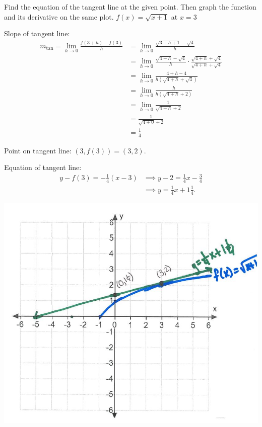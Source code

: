 \documentclass[nooutcomes, handout]{ximera}
\begin{document}
\begin{problem} Find the equation of the tangent line at the given point.  Then graph the function and its derivative on the same plot.
$f(x)=\sqrt{x+1}$ at $x=3$

	\begin{freeResponse}
	Slope of tangent line:
	\begin{align*}	
	m_{\mathrm{tan}} = \lim_{h \to 0} \frac{f(3+h) - f(3)}{h}&=\lim_{h \to 0}\frac{\sqrt{3+h+1} - \sqrt{4}}{h}\\
	&=\lim_{h \to 0}\frac{\sqrt{4+h} - \sqrt{4}}{h} \cdot \frac{\sqrt{4+h} + \sqrt{4}}{\sqrt{4+h} + \sqrt{4}}\\
	&=\lim_{h \to 0}\frac{4+h-4}{h(\sqrt{4+h} + \sqrt{4})}\\
	&=\lim_{h \to 0}\frac{h}{h(\sqrt{4+h} + 2)}\\
	&=\lim_{h \to 0}\frac{1}{\sqrt{4+h} + 2}\\
	&=\frac{1}{\sqrt{4+0} + 2}\\
	&=\frac{1}{4}
	\end{align*}

        Point on tangent line: $(3, f(3)) = (3, 2)$.

        Equation of tangent line:
        \begin{align*}
          y - f(3) = - \frac{1}{4}(x-3) &\implies y - 2 = \frac{1}{4}x - \frac{3}{4}\\
          &\implies y = \frac{1}{4}x + 1\frac{1}{4}.
        \end{align*}
	        \begin{image}
          \includegraphics[scale = 0.6]{Figure5.JPG}
        \end{image}

	\end{freeResponse}

\end{problem}
\end{document}
